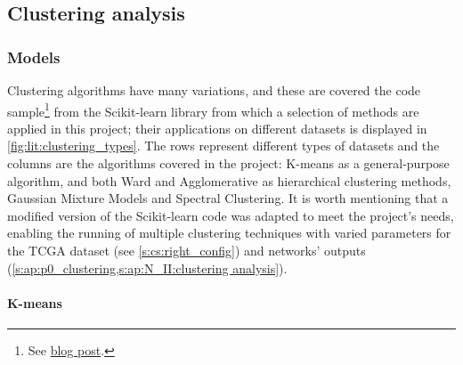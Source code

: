 \subsection{Clustering analysis} \label{s:lit:clustering}

\subsubsection*{Models} \label{s:lit:cs_models}

Clustering algorithms have many variations, and these are covered the code sample\footnote{See \href{https://scikit-learn.org/stable/modules/clustering.html}{blog post}.} from the Scikit-learn library \citep{Pedregosa2011-ts} from which a selection of methods are applied in this project; their applications on different datasets is displayed in \cref{fig:lit:clustering_types}. The rows represent different types of datasets and the columns are the algorithms covered in the project: K-means as a general-purpose algorithm, and both Ward and Agglomerative as hierarchical clustering methods, Gaussian Mixture Models and Spectral Clustering. It is worth mentioning that a modified version of the Scikit-learn code was adapted to meet the project's needs, enabling the running of multiple clustering techniques with varied parameters for the TCGA dataset (see \cref{s:cs:right_config}) and networks' outputs (\cref{s:ap:p0_clustering,s:ap:N_II:clustering analysis}).

\paragraph*{K-means}

